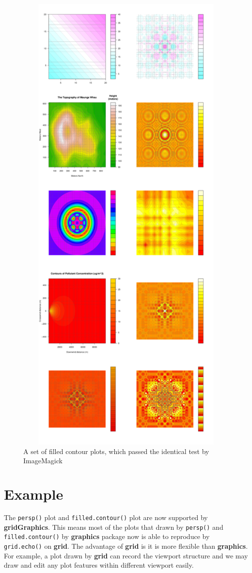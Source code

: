 \documentclass[11pt,twoside]{report}
\begin{document}
\begin{figure}[h]
	\begin{center}
		\includegraphics[height = 24cm, width = 12cm]{figure/montage/filled-contour-montage.png}
		\caption{A set of filled contour plots, which passed the identical test by ImageMagick}
		\label{chapter5.3}
	\end{center}
\end{figure}


\chapter{Example}
The \texttt{persp()} plot and \texttt{filled.contour()} plot are now supported by \textbf{gridGraphics}. This means most of the plots that drawn by \texttt{persp()} and \texttt{filled.contour()} by \textbf{graphics} package now is able to reproduce by \texttt{grid.echo()} on \textbf{grid}. The advantage of \textbf{grid} is it is more flexible than \textbf{graphics}. For example, a plot drawn by \textbf{grid} can record the viewport structure and we may draw and edit any plot features within different viewport easily.
\end{document}
